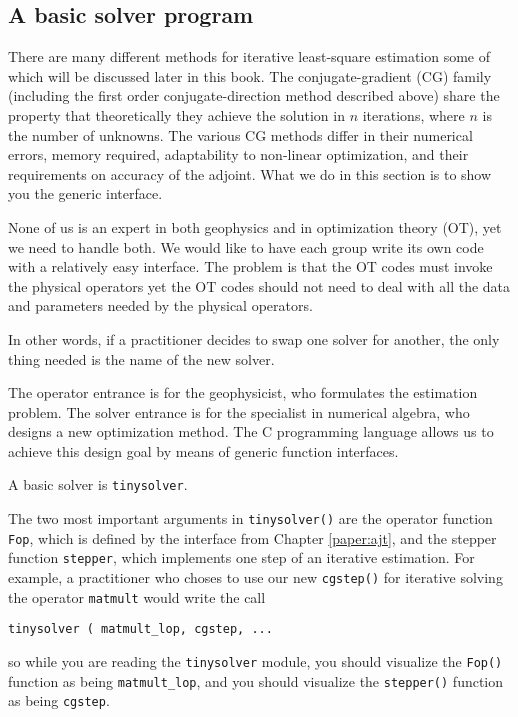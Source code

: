 \subsection{A basic solver program}
There are many different methods for iterative least-square estimation
some of which will be discussed later in this book.
The conjugate-gradient (CG) family
(including the first order conjugate-direction method described above)
share the property that theoretically they achieve the solution
in $n$ iterations, where $n$ is the number of unknowns.
The various CG methods differ
in their numerical errors,
memory required,
adaptability to non-linear optimization,
and their requirements on accuracy of the adjoint.
What we do in this section is to show you the generic interface.
\par
None of us is an expert in both geophysics and in optimization theory (OT),
yet we need to handle both.
We would like to have each group write its own code with
a relatively easy interface.
The problem is that the OT codes must invoke the physical operators
yet the OT codes should not
need to deal with all the data and parameters needed by the physical operators.
\par
In other words,
if a practitioner decides to
swap one solver for another,
the only thing needed is the name of the new solver.
\par
The operator entrance is for the geophysicist,
who formulates the estimation problem.
The solver entrance is for the specialist in numerical algebra,
who designs a new optimization method.
The C programming language allows us
to achieve this design goal by means of generic function interfaces.
\par
A basic solver is \texttt{tinysolver}.


\par
The two most important arguments in \texttt{tinysolver()}
are the operator function \texttt{Fop},
which is defined by the interface from Chapter \ref{paper:ajt},
and the stepper function \texttt{stepper},
which implements one step of an iterative estimation.
For example, a practitioner who choses to use our new
\texttt{cgstep()} 
for iterative solving the operator
\texttt{matmult} 
would write the call
\par
\texttt{tinysolver ( matmult\_lop, cgstep, ...}
\par\noindent
so while you are reading the \texttt{tinysolver} module,
you should visualize the \texttt{Fop()} function
as being \texttt{matmult\_lop}, and
you should visualize the \texttt{stepper()} function
as being \texttt{cgstep}.

